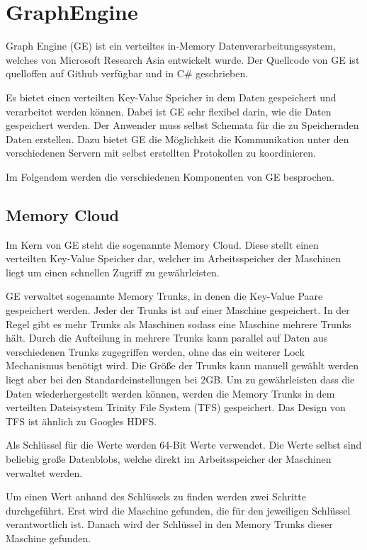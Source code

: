 \section{GraphEngine}

Graph Engine (GE) ist ein verteiltes in-Memory Datenverarbeitungssystem, welches von Microsoft Research Asia 
entwickelt wurde. Der Quellcode von GE ist quelloffen auf Github verfügbar und in C\# geschrieben.

Es bietet einen verteilten Key-Value Speicher in dem Daten gespeichert und verarbeitet werden können. Dabei ist GE sehr flexibel darin, wie die Daten gespeichert werden. Der Anwender muss selbst
Schemata für die zu Speichernden Daten erstellen. Dazu bietet GE die Möglichkeit die Kommunikation unter den verschiedenen Servern mit selbst erstellten Protokollen zu koordinieren.

Im Folgendem werden die verschiedenen Komponenten von GE besprochen.

\subsection{Memory Cloud}

Im Kern von GE steht die sogenannte Memory Cloud. Diese stellt einen verteilten Key-Value Speicher dar, welcher im Arbeitsspeicher der Maschinen
liegt um einen schnellen Zugriff zu gewährleisten.

GE verwaltet sogenannte Memory Trunks, in denen die Key-Value Paare gespeichert werden. Jeder der Trunks ist auf einer Maschine gespeichert.
In der Regel gibt es mehr Trunks als Maschinen sodass eine Maschine mehrere Trunks hält. Durch die Aufteilung in mehrere Trunks kann parallel auf Daten aus verschiedenen Trunks zugegriffen
werden, ohne das ein weiterer Lock Mechanismus benötigt wird. Die Größe der Trunks kann manuell gewählt werden liegt aber bei den Standardeinstellungen bei 2GB.
Um zu gewährleisten dass die Daten wiederhergestellt werden können, werden die Memory Trunks in dem verteilten Dateisystem Trinity File System (TFS) gespeichert. Das Design von TFS ist ähnlich zu Googles HDFS.

Als Schlüssel für die Werte werden 64-Bit Werte verwendet.
Die Werte selbst sind beliebig große Datenblobs, welche direkt im Arbeitsspeicher der Maschinen verwaltet werden.


Um einen Wert anhand des Schlüssels zu finden werden zwei Schritte durchgeführt. Erst wird die Maschine gefunden, die für den jeweiligen Schlüssel
verantwortlich ist. Danach wird der Schlüssel in den Memory Trunks dieser Maschine gefunden.

